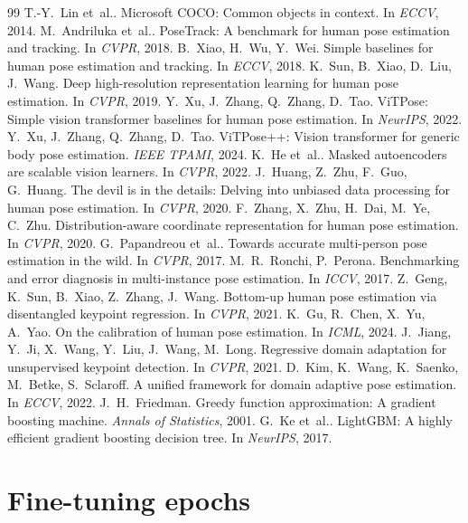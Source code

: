 \documentclass[10pt,twocolumn,letterpaper]{article}
\newcommand{\etal}{et~al.}
\begin{document}
{\small
\begin{thebibliography}{99}\setlength{\itemsep}{0pt}
 T.-Y.~Lin \etal. Microsoft COCO: Common objects in context. In \textit{ECCV}, 2014.
 M.~Andriluka \etal. PoseTrack: A benchmark for human pose estimation and tracking. In \textit{CVPR}, 2018.
 B.~Xiao, H.~Wu, Y.~Wei. Simple baselines for human pose estimation and tracking. In \textit{ECCV}, 2018.
 K.~Sun, B.~Xiao, D.~Liu, J.~Wang. Deep high-resolution representation learning for human pose estimation. In \textit{CVPR}, 2019.
 Y.~Xu, J.~Zhang, Q.~Zhang, D.~Tao. ViTPose: Simple vision transformer baselines for human pose estimation. In \textit{NeurIPS}, 2022.
 Y.~Xu, J.~Zhang, Q.~Zhang, D.~Tao. ViTPose++: Vision transformer for generic body pose estimation. \textit{IEEE TPAMI}, 2024.
 K.~He \etal. Masked autoencoders are scalable vision learners. In \textit{CVPR}, 2022.
 J.~Huang, Z.~Zhu, F.~Guo, G.~Huang. The devil is in the details: Delving into unbiased data processing for human pose estimation. In \textit{CVPR}, 2020.
 F.~Zhang, X.~Zhu, H.~Dai, M.~Ye, C.~Zhu. Distribution-aware coordinate representation for human pose estimation. In \textit{CVPR}, 2020.
 G.~Papandreou \etal. Towards accurate multi-person pose estimation in the wild. In \textit{CVPR}, 2017.
 M.~R.~Ronchi, P.~Perona. Benchmarking and error diagnosis in multi-instance pose estimation. In \textit{ICCV}, 2017.
 Z.~Geng, K.~Sun, B.~Xiao, Z.~Zhang, J.~Wang. Bottom-up human pose estimation via disentangled keypoint regression. In \textit{CVPR}, 2021.
 K.~Gu, R.~Chen, X.~Yu, A.~Yao. On the calibration of human pose estimation. In \textit{ICML}, 2024.
 J.~Jiang, Y.~Ji, X.~Wang, Y.~Liu, J.~Wang, M.~Long. Regressive domain adaptation for unsupervised keypoint detection. In \textit{CVPR}, 2021.
 D.~Kim, K.~Wang, K.~Saenko, M.~Betke, S.~Sclaroff. A unified framework for domain adaptive pose estimation. In \textit{ECCV}, 2022.
 J.~H.~Friedman. Greedy function approximation: A gradient boosting machine. \textit{Annals of Statistics}, 2001.
 G.~Ke \etal. LightGBM: A highly efficient gradient boosting decision tree. In \textit{NeurIPS}, 2017.
\end{thebibliography}
}

\clearpage
\appendix
\onecolumn
\section{Fine-tuning epochs}
\label{app:epochs}
\end{document}

